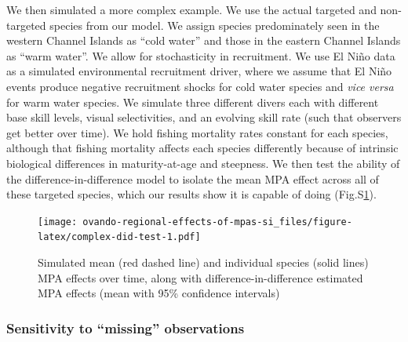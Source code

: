 \documentclass[]{article}
\begin{document}
We then simulated a more complex example. We use the actual targeted and non-targeted species from our model. We assign species predominately seen in the western Channel Islands as ``cold water'' and those in the eastern Channel Islands as ``warm water''. We allow for stochasticity in recruitment. We use El Niño data as a simulated environmental recruitment driver, where we assume that El Niño events produce negative recruitment shocks for cold water species and \emph{vice versa} for warm water species. We simulate three different divers each with different base skill levels, visual selectivities, and an evolving skill rate (such that observers get better over time). We hold fishing mortality rates constant for each species, although that fishing mortality affects each species differently because of intrinsic biological differences in maturity-at-age and steepness. We then test the ability of the difference-in-difference model to isolate the mean MPA effect across all of these targeted species, which our results show it is capable of doing (Fig.S\ref{fig:complex-did-test}).

\begin{figure}
\centering
\texttt{[image: ovando-regional-effects-of-mpas-si\_files/figure-latex/complex-did-test-1.pdf]}
\caption{\label{fig:complex-did-test}Simulated mean (red dashed line) and individual species (solid lines) MPA effects over time, along with difference-in-difference estimated MPA effects (mean with 95\% confidence intervals)}
\end{figure}

\hypertarget{sensitivity-to-missing-observations}{%
\subsubsection{Sensitivity to ``missing'' observations}\label{sensitivity-to-missing-observations}}
\end{document}
